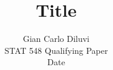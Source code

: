 \documentclass{article}
\title{Title}
\author{%
  Gian Carlo Diluvi \\
  STAT 548 Qualifying Paper \\
  Date
}
\begin{document}
\onehalfspacing
\maketitle




\clearpage
\small





\end{document}
